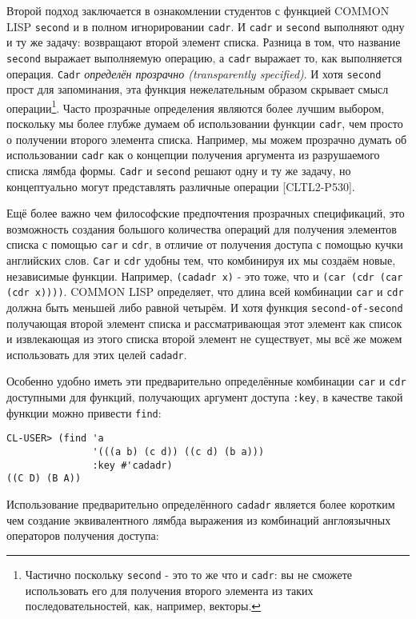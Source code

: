Второй подход заключается в ознакомлении студентов с функцией COMMON LISP \verb"second" и в полном игнорировании \verb"cadr". И \verb"cadr" и \verb"second" выполняют одну и ту же задачу: возвращают второй элемент списка. Разница в том, что название \verb"second" выражает выполняемую операцию, а \verb"cadr" выражает то, как выполняется операция. \verb"Cadr" \emph{определён прозрачно (transparently specified)}. И хотя \verb"second" прост для запоминания, эта функция нежелательным образом скрывает смысл операции\footnote{Частично поскольку \verb"second" - это то же что и \verb"cadr": вы не сможете использовать его для получения второго элемента из таких последовательностей, как, например, векторы.}. Часто прозрачные определения являются более лучшим выбором, поскольку мы более глубже думаем об использовании функции \verb"cadr", чем просто о получении второго элемента списка. Например, мы можем прозрачно думать об использовании \verb"cadr" как о концепции получения аргумента из разрушаемого списка лямбда формы. \verb"Cadr" и \verb"second" решают одну и ту же задачу, но концептуально могут представлять различные операции [CLTL2-P530].



Ещё более важно чем философские предпочтения прозрачных спецификаций, это возможность создания большого количества операций для получения элементов списка с помощью \verb"car" и \verb"cdr", в отличие от получения доступа с помощью кучки английских слов. \verb"Car" и \verb"cdr" удобны тем, что комбинируя их мы создаём новые, независимые функции. Например, \verb"(cadadr x)" - это тоже, что и \verb"(car (cdr (car (cdr x))))". COMMON LISP определяет, что длина всей комбинации \verb"car" и \verb"cdr" должна быть меньшей либо равной четырём. И хотя функция \verb"second-of-second" получающая второй элемент списка и рассматривающая этот элемент как список и извлекающая из этого списка второй элемент не существует, мы всё же можем использовать для этих целей \verb"cadadr".

Особенно удобно иметь эти предварительно определённые комбинации \verb"car" и \verb"cdr" доступными для функций, получающих аргумент доступа \verb":key", в качестве такой функции можно привести \verb"find":

\begin{verbatim}
CL-USER> (find 'a
               '(((a b) (c d)) ((c d) (b a)))
               :key #'cadadr)
((C D) (B A))
\end{verbatim}

Использование предварительно определённого \verb"cadadr" является более коротким чем создание эквивалентного лямбда выражения из комбинаций англоязычных операторов получения доступа:

